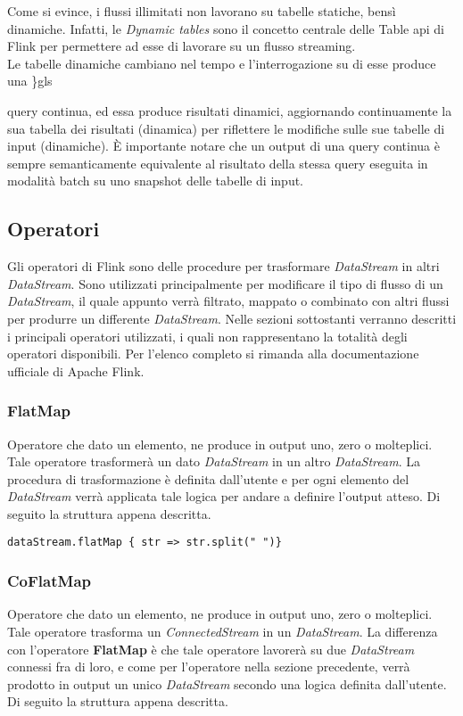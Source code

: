Come si evince, i flussi illimitati non lavorano su tabelle statiche, bensì dinamiche. Infatti, le \textit{Dynamic tables} sono il concetto centrale delle Table \gls{api} di Flink per permettere ad esse di lavorare su un flusso streaming.\\
Le tabelle dinamiche cambiano nel tempo e l'interrogazione su di esse produce una \}gls{query continua, ed essa produce risultati dinamici, aggiornando continuamente la sua tabella dei risultati (dinamica) per riflettere le modifiche sulle sue tabelle di input (dinamiche). È importante notare che un output di una \gls{query} continua è sempre semanticamente equivalente al risultato della stessa \gls{query} eseguita in modalità batch su uno \gls{snapshot} delle tabelle di input.



\subsection{Operatori}\label{sec:operatori}
Gli operatori di Flink sono delle procedure per trasformare \textit{DataStream} in altri \textit{DataStream}. Sono utilizzati principalmente per modificare il tipo di flusso di un \textit{DataStream}, il quale appunto verrà filtrato, mappato o combinato con altri flussi per produrre un differente \textit{DataStream}. Nelle sezioni sottostanti verranno descritti i principali operatori utilizzati, i quali non rappresentano la totalità degli operatori disponibili. Per l'elenco completo si rimanda alla documentazione ufficiale di Apache Flink.

\subsubsection{FlatMap}
Operatore che dato un elemento, ne produce in output uno, zero o molteplici. Tale operatore trasformerà un dato \textit{DataStream} in un altro \textit{DataStream}. La procedura di trasformazione è definita dall'utente e per ogni elemento del \textit{DataStream} verrà applicata tale logica per andare a definire l'output atteso. Di seguito la struttura appena descritta.

\begin{verbatim}
dataStream.flatMap { str => str.split(" ")}
\end{verbatim}
	
	
\subsubsection{CoFlatMap}
Operatore che dato un elemento, ne produce in output uno, zero o molteplici. Tale operatore trasforma un \textit{ConnectedStream} in un \textit{DataStream}. La differenza con l'operatore \textbf{FlatMap} è che tale operatore lavorerà su due \textit{DataStream} connessi fra di loro, e come per l'operatore nella sezione precedente, verrà prodotto in output un unico \textit{DataStream} secondo una logica definita dall'utente. Di seguito la struttura appena descritta.

}
